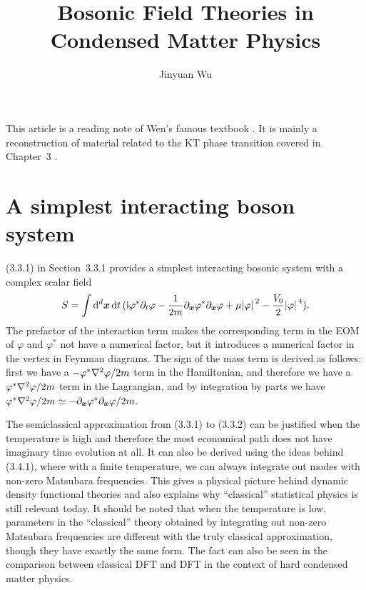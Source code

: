 \documentclass[hyperref, a4paper]{article}
\title{Bosonic Field Theories in Condensed Matter Physics}
\author{Jinyuan Wu}
\newcommand*{\ii}{\mathrm{i}}
\begin{document}
\maketitle

This article is a reading note of Wen's famous textbook \cite{Wen2007}. 
It is mainly a reconstruction of material related to the KT phase transition covered in Chapter~3 . 

\section{A simplest interacting boson system}

(3.3.1) in Section~3.3.1 provides a simplest interacting bosonic system with a complex scalar field 
\begin{equation}
    S = \int \dd[d]{\vb*{x}} \dd{t} (\ii \varphi^* \partial_t \varphi - \frac{1}{2m} \partial_{\vb*{x}} \varphi^* \partial_{\vb*{x}} \varphi + \mu \abs*{\varphi}^2 - \frac{V_0}{2} \abs*{\varphi}^4).
    \label{eq:bosonic}
\end{equation}
The prefactor of the interaction term makes the corresponding term in the EOM of $\varphi$ and $\varphi^*$ not 
have a numerical factor, but it introduces a numerical factor in the vertex in Feynman diagrams. The sign of 
the mass term is derived as follows: first we have a $- \varphi^* \laplacian \varphi / 2m$ term in the 
Hamiltonian, and therefore we have a $\varphi^* \laplacian \varphi / 2m$ term in the Lagrangian, and by 
integration by parts we have $\varphi^* \laplacian \varphi / 2m \simeq - \partial_{\vb*{x}} \varphi^* 
\partial_{\vb*{x}} \varphi / 2m$. 

The semiclassical approximation from (3.3.1) to (3.3.2) can be justified when the temperature is high 
and therefore the most economical path does not have imaginary time evolution at all. It can also 
be derived using the ideas behind (3.4.1), where with a finite temperature, we can always integrate 
out modes with non-zero Matsubara frequencies. This gives a physical picture behind dynamic density 
functional theories and also explains why ``classical'' statistical physics is still relevant today.
It should be noted that when the temperature is low, parameters in the ``classical'' theory obtained 
by integrating out non-zero Matsubara frequencies are different with the truly classical approximation,
though they have exactly the same form. The fact can also be seen in the comparison between classical DFT 
and DFT in the context of hard condensed matter physics.
\end{document}
